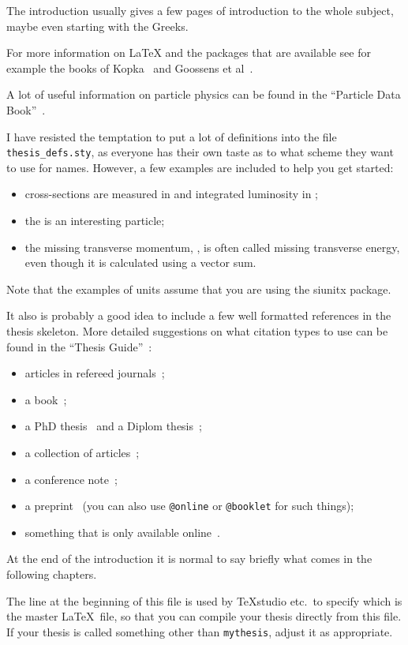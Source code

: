The introduction usually gives a few pages of introduction to the
whole subject, maybe even starting with the Greeks.

For more information on \LaTeX{} and the packages that are available
see for example the books of Kopka~\cite{kopka04} and Goossens et
al~\cite{goossens04}.

A lot of useful information on particle physics can be found in the
\enquote{Particle Data Book}~\cite{pdg2010}.

I have resisted the temptation to put a lot of definitions into the
file \texttt{thesis\_defs.sty}, as everyone has their own taste as
to what scheme they want to use for names.
However, a few examples are included to help you get started:
\begin{itemize}
\setlength{\itemsep}{0pt}\setlength{\parskip}{0pt}
\item cross-sections are measured in \si{\pb} and integrated
  luminosity in \si{\invpb};
\item the \KoS is an interesting particle;
\item the missing transverse momentum, \pTmiss, is often called
  missing transverse energy, even though it is calculated using a vector sum.
\end{itemize}
Note that the examples of units assume that you are using the
\textsf{siunitx} package.

It also is probably a good idea to include a few well formatted
references in the thesis skeleton. More detailed suggestions on what
citation types to use can be found in the \enquote{Thesis Guide}~\cite{thesis-guide}:
\begin{itemize}
\item articles in refereed journals~\cite{pdg2010,Aad:2010ey};
\item a book~\cite{Halzen:1984mc};
\item a PhD thesis~\cite{tlodd:2012} and a Diplom thesis~\cite{mergelmeyer:2011};
\item a collection of articles~\cite{lhc:vol1};
\item a conference note~\cite{ATLAS-CONF-2011-008};
\item a preprint~\cite{atlas:perf:2009} (you can also use
  \texttt{@online} or \texttt{@booklet} for such things);
\item something that is only available online~\cite{thesis-guide}.
\end{itemize}

At the end of the introduction it is normal to say briefly what comes
in the following chapters.

The line at the beginning of this file is used by TeXstudio etc.\ to
specify which is the master \LaTeX\ file, so that you can compile your thesis
directly from this file.
If your thesis is called something other than \texttt{mythesis}, adjust it as appropriate.


